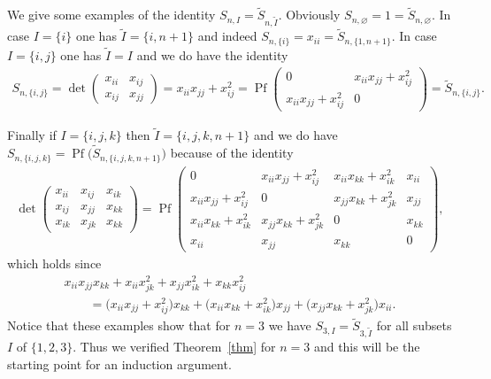 \documentclass[10pt,a4paper]{amsart}
\newcommand{\tI}{{\tilde{I}}}
\newcommand{\tS}{{\tilde{S}}}
\numberwithin{equation}{section}
\begin{document}
\begin{Examples}
We give some examples of the identity $S_{n,I}=\tS_{n,\tI}$. Obviously $S_{n,\varnothing}=1=\tS_{n,\varnothing}$. In case $I=\{i\}$ one has $\tI=\{i,n+1\}$ and indeed $S_{n,\{i\}}=x_{ii}=\tS_{n,\{1,n+1\}}$. In case $I=\{i,j\}$ one has $\tI=I$ and we do have the identity
\begin{gather*}
S_{n,\{i,j\}} = \det \left(\begin{matrix} x_{ii}&x_{ij}\\x_{ij}&x_{jj}\end{matrix}\right)
 = x_{ii}x_{jj}+x_{ij}^2 =
\operatorname{Pf} \left(\begin{matrix} 0&x_{ii}x_{jj}+x_{ij}^2\\x_{ii}x_{jj}+x_{ij}^2&0\end{matrix}\right) = \tS_{n,\{i,j\}}.
\end{gather*}

Finally if $I=\{i,j,k\}$ then $\tI=\{i,j,k,n+1\}$ and we do have $S_{n,\{i,j,k\}}=\operatorname{Pf}\big(\tS_{n,\{i,j,k,n+1\}}\big)$ because of the identity
\begin{gather*}
\det \left(\begin{matrix} x_{ii}&x_{ij}&x_{ik}\\
x_{ij}&x_{jj}&x_{kk}\\
x_{ik}&x_{jk}&x_{kk}
\end{matrix}\right) = \operatorname{Pf} \left(\begin{matrix}
0&x_{ii}x_{jj}+x_{ij}^2&x_{ii}x_{kk}+x_{ik}^2&x_{ii}\\
x_{ii}x_{jj}+x_{ij}^2&0& x_{jj}x_{kk}+x_{jk}^2& x_{jj}\\
x_{ii}x_{kk}+x_{ik}^2& x_{jj}x_{kk}+x_{jk}^2 &0&x_{kk}\\
x_{ii}&x_{jj}&x_{kk}&0
\end{matrix}\right),
\end{gather*}
which holds since
\begin{gather*}
x_{ii}x_{jj}x_{kk}+x_{ii}x_{jk}^2 + x_{jj}x_{ik}^2 + x_{kk}x_{ij}^2\\
\qquad{} = \big(x_{ii}x_{jj}+x_{ij}^2\big)x_{kk}+\big(x_{ii}x_{kk}+x_{ik}^2\big)x_{jj}+\big(x_{jj}x_{kk}+x_{jk}^2\big)x_{ii}.
\end{gather*}
Notice that these examples show that for $n=3$ we have $S_{3,I} = \tS_{3,\tI}$ for all subsets $I$ of $\{1,2,3\}$. Thus we verified Theorem~\ref{thm} for $n=3$ and this will be the starting point for an induction argument.
\end{Examples}
\end{document}
